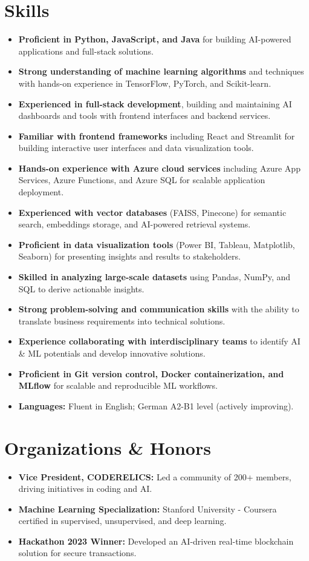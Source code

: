 \documentclass[a4paper,10pt]{article}
\begin{document}
\section{Skills}
\begin{itemize}
    \item \textbf{Proficient in Python, JavaScript, and Java} for building AI-powered applications and full-stack solutions.
    \item \textbf{Strong understanding of machine learning algorithms} and techniques with hands-on experience in TensorFlow, PyTorch, and Scikit-learn.
    \item \textbf{Experienced in full-stack development}, building and maintaining AI dashboards and tools with frontend interfaces and backend services.
    \item \textbf{Familiar with frontend frameworks} including React and Streamlit for building interactive user interfaces and data visualization tools.
    \item \textbf{Hands-on experience with Azure cloud services} including Azure App Services, Azure Functions, and Azure SQL for scalable application deployment.
    \item \textbf{Experienced with vector databases} (FAISS, Pinecone) for semantic search, embeddings storage, and AI-powered retrieval systems.
    \item \textbf{Proficient in data visualization tools} (Power BI, Tableau, Matplotlib, Seaborn) for presenting insights and results to stakeholders.
    \item \textbf{Skilled in analyzing large-scale datasets} using Pandas, NumPy, and SQL to derive actionable insights.
    \item \textbf{Strong problem-solving and communication skills} with the ability to translate business requirements into technical solutions.
    \item \textbf{Experience collaborating with interdisciplinary teams} to identify AI \& ML potentials and develop innovative solutions.
    \item \textbf{Proficient in Git version control, Docker containerization, and MLflow} for scalable and reproducible ML workflows.
    \item \textbf{Languages:} Fluent in English; German A2-B1 level (actively improving).
\end{itemize}

\section{Organizations \& Honors}
\begin{itemize}
    \item \textbf{Vice President, CODERELICS:} Led a community of 200+ members, driving initiatives in coding and AI.
    \item \textbf{Machine Learning Specialization:} Stanford University - Coursera certified in supervised, unsupervised, and deep learning.
    \item \textbf{Hackathon 2023 Winner:} Developed an AI-driven real-time blockchain solution for secure transactions.
\end{itemize}
\end{document}
